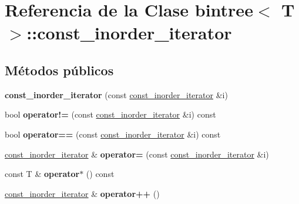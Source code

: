\hypertarget{classbintree_1_1const__inorder__iterator}{}\section{Referencia de la Clase bintree$<$ T $>$\+:\+:const\+\_\+inorder\+\_\+iterator}
\label{classbintree_1_1const__inorder__iterator}
\subsection*{Métodos públicos}
\begin{DoxyCompactItemize}
\item 
{\bfseries const\+\_\+inorder\+\_\+iterator} (const \hyperlink{classbintree_1_1const__inorder__iterator}{const\+\_\+inorder\+\_\+iterator} \&i)\hypertarget{classbintree_1_1const__inorder__iterator_a349ef30a75ffd281507e23c44b63b47d}{}\label{classbintree_1_1const__inorder__iterator_a349ef30a75ffd281507e23c44b63b47d}

\item 
bool {\bfseries operator!=} (const \hyperlink{classbintree_1_1const__inorder__iterator}{const\+\_\+inorder\+\_\+iterator} \&i) const \hypertarget{classbintree_1_1const__inorder__iterator_adb0707c132be502ff6060c0903ee0e15}{}\label{classbintree_1_1const__inorder__iterator_adb0707c132be502ff6060c0903ee0e15}

\item 
bool {\bfseries operator==} (const \hyperlink{classbintree_1_1const__inorder__iterator}{const\+\_\+inorder\+\_\+iterator} \&i) const \hypertarget{classbintree_1_1const__inorder__iterator_ab72bbbdbcc4cbc2a4aa41b68c3f36902}{}\label{classbintree_1_1const__inorder__iterator_ab72bbbdbcc4cbc2a4aa41b68c3f36902}

\item 
\hyperlink{classbintree_1_1const__inorder__iterator}{const\+\_\+inorder\+\_\+iterator} \& {\bfseries operator=} (const \hyperlink{classbintree_1_1const__inorder__iterator}{const\+\_\+inorder\+\_\+iterator} \&i)\hypertarget{classbintree_1_1const__inorder__iterator_af39b2e86d988ac75caaa302be135a59c}{}\label{classbintree_1_1const__inorder__iterator_af39b2e86d988ac75caaa302be135a59c}

\item 
const T \& {\bfseries operator$\ast$} () const \hypertarget{classbintree_1_1const__inorder__iterator_ab3efab537bc01fb254c83efffb5c432e}{}\label{classbintree_1_1const__inorder__iterator_ab3efab537bc01fb254c83efffb5c432e}

\item 
\hyperlink{classbintree_1_1const__inorder__iterator}{const\+\_\+inorder\+\_\+iterator} \& {\bfseries operator++} ()\hypertarget{classbintree_1_1const__inorder__iterator_a85da901a2124e3e24921e7cfbfb47e03}{}\label{classbintree_1_1const__inorder__iterator_a85da901a2124e3e24921e7cfbfb47e03}

\end{DoxyCompactItemize}
